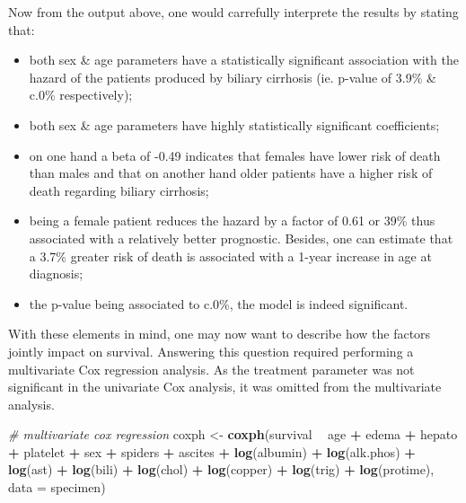 \documentclass[]{article}
\newenvironment{Shaded}{\begin{snugshade}}{\end{snugshade}}
\newcommand{\KeywordTok}[1]{\textcolor[rgb]{0.13,0.29,0.53}{\textbf{#1}}}
\newcommand{\DataTypeTok}[1]{\textcolor[rgb]{0.13,0.29,0.53}{#1}}
\newcommand{\StringTok}[1]{\textcolor[rgb]{0.31,0.60,0.02}{#1}}
\newcommand{\CommentTok}[1]{\textcolor[rgb]{0.56,0.35,0.01}{\textit{#1}}}
\newcommand{\OperatorTok}[1]{\textcolor[rgb]{0.81,0.36,0.00}{\textbf{#1}}}
\newcommand{\NormalTok}[1]{#1}
\providecommand{\tightlist}{%
  \setlength{\itemsep}{0pt}\setlength{\parskip}{0pt}}
\begin{document}
Now from the output above, one would carrefully interprete the results
by stating that:

\begin{itemize}
\tightlist
\item
  both sex \& age parameters have a statistically significant
  association with the hazard of the patients produced by biliary
  cirrhosis (ie. p-value of 3.9\% \& c.0\% respectively);
\item
  both sex \& age parameters have highly statistically significant
  coefficients;
\item
  on one hand a beta of -0.49 indicates that females have lower risk of
  death than males and that on another hand older patients have a higher
  risk of death regarding biliary cirrhosis;
\item
  being a female patient reduces the hazard by a factor of 0.61 or 39\%
  thus associated with a relatively better prognostic. Besides, one can
  estimate that a 3.7\% greater risk of death is associated with a
  1-year increase in age at diagnosis;
\item
  the p-value being associated to c.0\%, the model is indeed
  significant.
\end{itemize}

With these elements in mind, one may now want to describe how the
factors jointly impact on survival. Answering this question required
performing a multivariate Cox regression analysis. As the treatment
parameter was not significant in the univariate Cox analysis, it was
omitted from the multivariate analysis.

\begin{Shaded}
\begin{Highlighting}[]
\CommentTok{# multivariate cox regression}
\NormalTok{coxph <-}\StringTok{ }\KeywordTok{coxph}\NormalTok{(survival  }\OperatorTok{~}\StringTok{ }\NormalTok{age }\OperatorTok{+}\StringTok{ }\NormalTok{edema }\OperatorTok{+}\StringTok{ }\NormalTok{hepato }\OperatorTok{+}\StringTok{ }\NormalTok{platelet }\OperatorTok{+}\StringTok{ }\NormalTok{sex }\OperatorTok{+}\StringTok{ }\NormalTok{spiders }\OperatorTok{+}\StringTok{ }\NormalTok{ascites }
               \OperatorTok{+}\StringTok{ }\KeywordTok{log}\NormalTok{(albumin) }\OperatorTok{+}\StringTok{ }\KeywordTok{log}\NormalTok{(alk.phos) }\OperatorTok{+}\StringTok{ }\KeywordTok{log}\NormalTok{(ast) }\OperatorTok{+}\StringTok{ }\KeywordTok{log}\NormalTok{(bili) }\OperatorTok{+}\StringTok{ }\KeywordTok{log}\NormalTok{(chol) }
               \OperatorTok{+}\StringTok{ }\KeywordTok{log}\NormalTok{(copper) }\OperatorTok{+}\StringTok{ }\KeywordTok{log}\NormalTok{(trig) }\OperatorTok{+}\StringTok{ }\KeywordTok{log}\NormalTok{(protime), }\DataTypeTok{data =}\NormalTok{ specimen)}
\end{Highlighting}
\end{Shaded}
\end{document}
